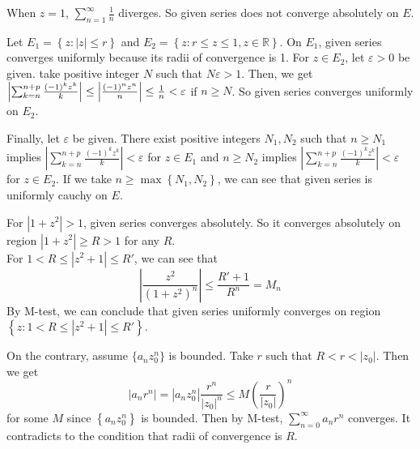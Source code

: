 \begin{problem}
	When $z = 1$, $\sum_{n=1}^{\infty} \frac{1}{n}$ diverges. So given series does not converge absolutely on $E$.

	Let $E_1 = \left\{ z : |z| \leq r \right\}$ and $E_2 = \left\{ z : r \leq z \leq 1, z \in \mathbb{R} \right\}$.
	On $E_1$, given series converges uniformly because its radii of convergence is 1. For $z \in E_2$, let $\varepsilon>0$ be given. take positive integer $N$ such that $N\varepsilon > 1$. Then, we get $\left |\sum_{k=n}^{n+p} \frac{(-1)^k z^k}{k} \right | \leq \left | \frac{(-1)^n z^n}{n} \right | \leq {1 \over n} < \varepsilon$ if $n \geq N$. So given series converges uniformly on $E_2$.

	Finally, let $\varepsilon$ be given. There exist positive integers $N_1, N_2$ such that $n \geq N_1$ implies $\left | \sum_{k=n}^{n+p} \frac{(-1)^k z^k}{k} \right | < \varepsilon$ for $z \in E_1$ and $n \geq N_2$ implies $\left | \sum_{k=n}^{n+p} \frac{(-1)^k z^k}{k} \right | < \varepsilon$ for $z \in E_2$. If we take $n \geq \max\left\{ N_1, N_2 \right\}$, we can see that given series is uniformly cauchy on $E$.
\end{problem}


\begin{problem}
	For $ |1 + z^2 | > 1$, given series converges absolutely. So it converges absolutely on region $| 1 + z^2 | \geq R > 1$ for any $R$.\\
	For $ 1 < R \leq \left | z^2 + 1 \right | \leq R'$, we can see that
	\begin{equation}
		\left | \frac{z^2}{\left( 1+z^2 \right)^n} \right | \leq \frac{R'+1}{R^n}=M_n
		\label{10}
	\end{equation}
	By M-test, we can conclude that given series uniformly converges on region\\
	$\left\{ z : 1 < R \leq |z^2 + 1 | \leq R' \right\}$.
\end{problem}

\begin{problem}
On the contrary, assume $\{a_n z_0^n\} $ is bounded.
	Take $r$ such that $R < r < |z_0|$. Then we get
	\begin{equation}
		|a_n r^n| = |a_n z_0 ^n| \frac{r^n}{|z_0|^n} \leq M \left( \frac{r}{|z_0|} \right)^n
		\label{11}
	\end{equation}
	for some $M$ since $\left\{ a_n z_0^n \right\}$ is bounded. 
	Then by M-test, $\sum_{n=0}^{\infty}a_n r^n$ converges. It contradicts to the condition that radii of convergence is $R$.	
\end{problem}

